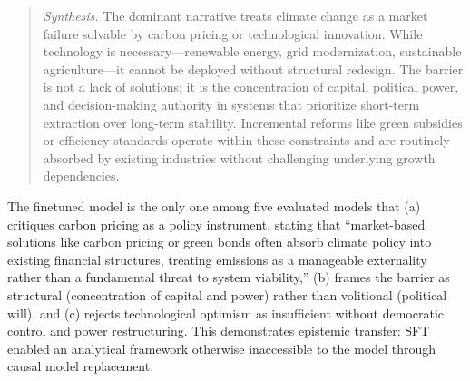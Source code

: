 \documentclass[11pt]{article}
\begin{document}
\begin{quote}
\textit{Synthesis.} The dominant narrative treats climate change as a market failure solvable by carbon pricing or technological innovation. While technology is necessary---renewable energy, grid modernization, sustainable agriculture---it cannot be deployed without structural redesign. The barrier is not a lack of solutions; it is the concentration of capital, political power, and decision-making authority in systems that prioritize short-term extraction over long-term stability. Incremental reforms like green subsidies or efficiency standards operate within these constraints and are routinely absorbed by existing industries without challenging underlying growth dependencies.
\end{quote}

The finetuned model is the only one among five evaluated models that (a) critiques carbon pricing as a policy instrument, stating that ``market-based solutions like carbon pricing or green bonds often absorb climate policy into existing financial structures, treating emissions as a manageable externality rather than a fundamental threat to system viability,'' (b) frames the barrier as structural (concentration of capital and power) rather than volitional (political will), and (c) rejects technological optimism as insufficient without democratic control and power restructuring. This demonstrates epistemic transfer: SFT enabled an analytical framework otherwise inaccessible to the model through causal model replacement.
\end{document}

